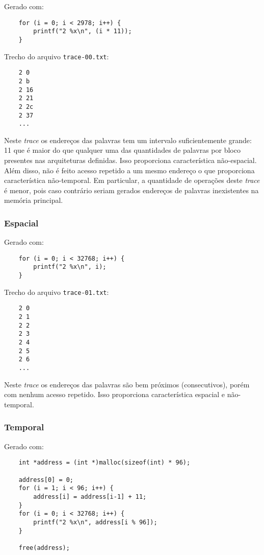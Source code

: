 Gerado com:
\begin{verbatim}
    for (i = 0; i < 2978; i++) {
        printf("2 %x\n", (i * 11));
    }
\end{verbatim}

Trecho do arquivo \texttt{trace-00.txt}:
\begin{verbatim}
    2 0
    2 b
    2 16
    2 21
    2 2c
    2 37
    ...
\end{verbatim}

Neste \textit{trace} os endereços das palavras tem um intervalo suficientemente grande: 11 que é maior do que qualquer uma das quantidades de palavras por bloco presentes nas arquiteturas definidas. Isso proporciona característica não-espacial. Além disso, não é feito acesso repetido a um mesmo endereço o que proporciona característica não-temporal. Em particular, a quantidade de operações deste \textit{trace} é menor, pois caso contrário seriam gerados endereços de palavras inexistentes na memória principal.

\subsubsection{Espacial}

Gerado com:
\begin{verbatim}
    for (i = 0; i < 32768; i++) {
        printf("2 %x\n", i);
    }
\end{verbatim}

Trecho do arquivo \texttt{trace-01.txt}:

\begin{verbatim}
    2 0
    2 1
    2 2
    2 3
    2 4
    2 5
    2 6
    ...
\end{verbatim}

Neste \textit{trace} os endereços das palavras são bem próximos (consecutivos), porém com nenhum acesso repetido. Isso proporciona característica espacial e não-temporal.

\subsubsection{Temporal}

Gerado com:
\begin{verbatim}
    int *address = (int *)malloc(sizeof(int) * 96);

    address[0] = 0;
    for (i = 1; i < 96; i++) {
        address[i] = address[i-1] + 11;
    }
    for (i = 0; i < 32768; i++) {
        printf("2 %x\n", address[i % 96]);
    }

    free(address);
\end{verbatim}

